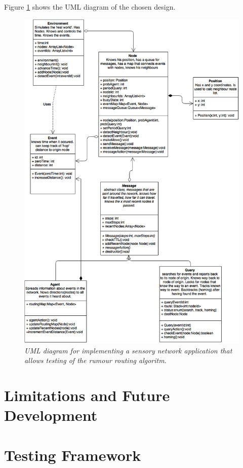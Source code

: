 \documentclass[a4paper,11pt,twoside]{article}
\begin{document}
Figure \ref{fig:uml} shows the UML diagram of the chosen design. 
\begin{figure}
\centering
\includegraphics[width=\textwidth]{uml.png}
\caption{\textit{UML diagram for implementing a sensory network application
  that allows testing of the rumour routing algoritm.}}
\label{fig:uml}
\end{figure}



\section{Limitations and Future Development}

\section{Testing Framework}
\end{document}
